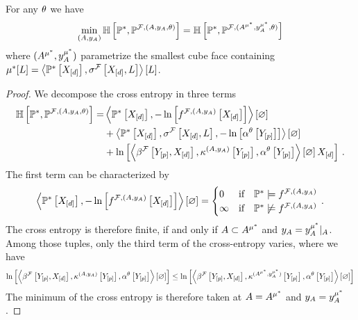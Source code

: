 \begin{lemma}
    \label{lem:minCrossEntropyHardparam}
    For any $\theta$ we have
    \begin{align*}
        \min_{(A,y_{A})} \mathbb{H}\left[\mathbb{P}^*,\mathbb{P}^{\mathcal{F},(A,y_{A},\theta)}\right]
        = \mathbb{H}\left[\mathbb{P}^*,\mathbb{P}^{\mathcal{F},(A^{\mu^*},y_{A}^{\mu^*},\theta)}\right]
    \end{align*}
    where $(A^{\mu^*},y_{A}^{\mu^*})$ parametrize the smallest cube face containing $\mu^*[L]=\left\langle \mathbb{P}^*\left[X_{[d]}\right],\sigma^{\mathcal{F}}\left[X_{[d]},L\right]\right\rangle \left[ L \right]$.
\end{lemma}
\begin{proof}
    We decompose the cross entropy in three terms
    \begin{align*}
        \mathbb{H}\left[\mathbb{P}^*,\mathbb{P}^{\mathcal{F},(A,y_{A},\theta)}\right]
        =& \left\langle \mathbb{P}^*\left[X_{[d]}\right],-\ln \left[ f^{\mathcal{F},(A,y_{A})}\left[X_{[d]}\right] \right]\right\rangle \left[ \varnothing \right] \\
        &+ \left\langle \mathbb{P}^*\left[X_{[d]}\right],\sigma^{\mathcal{F}}\left[X_{[d]},L\right],-\ln \left[ \alpha^\theta\left[Y_{[p]}\right] \right]\right\rangle \left[ \varnothing \right] \\
        &+ \ln \left[ \left\langle \beta^{\mathcal{F}}\left[Y_{[p]},X_{[d]}\right],\kappa^{(A,y_{A})}\left[Y_{[p]}\right],\alpha^\theta\left[Y_{[p]}\right]\right\rangle \left[ \varnothing \right]{X_{[d]}} \right] \, .
    \end{align*}
    The first term can be characterized by
    \begin{align*}
        \left\langle \mathbb{P}^*\left[X_{[d]}\right],-\ln \left[ f^{\mathcal{F},(A,y_{A})}\left[X_{[d]}\right] \right]\right\rangle \left[ \varnothing \right]
        =\begin{cases}
             0 & \text{if}\quad \mathbb{P}^*\models f^{\mathcal{F},(A,y_{A})} \\
             \infty & \text{if}\quad \mathbb{P}^*\not\models f^{\mathcal{F},(A,y_{A})}
        \end{cases} \, .
    \end{align*}
    The cross entropy is therefore finite, if and only if $A\subset A^{\mu^*}$ and $y_{A}={y_{A}^{\mu^*}}|_{A}$.
    Among those tuples, only the third term of the cross-entropy varies, where we have
    \begin{align*}
        \ln \left[ \left\langle \beta^{\mathcal{F}}\left[Y_{[p]},X_{[d]}\right],\kappa^{(A,y_{A})}\left[Y_{[p]}\right],\alpha^\theta\left[Y_{[p]}\right]\right\rangle \left[ \varnothing \right] \right]
\leq \ln \left[ \left\langle \beta^{\mathcal{F}}\left[Y_{[p]},X_{[d]}\right],\kappa^{(A^{\mu^*},y_{A}^{\mu^*})}\left[Y_{[p]}\right],\alpha^\theta\left[Y_{[p]}\right]\right\rangle \left[ \varnothing \right] \right]
    \end{align*}
    The minimum of the cross entropy is therefore taken at $A=A^{\mu^*}$ and $y_{A}=y_{A}^{\mu^*}$.
\end{proof}

